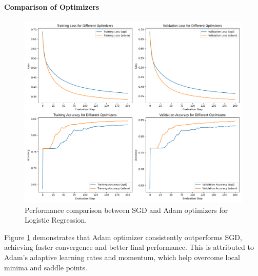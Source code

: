 \documentclass[journal, a4paper]{IEEEtran}
\begin{document}
\paragraph{Comparison of Optimizers}
\begin{figure}[htbp]
\centering
\includegraphics[width=\linewidth]{logistic_regression_optimizers.png}
\caption{Performance comparison between SGD and Adam optimizers for Logistic Regression.}
\label{fig:lr_opt}
\end{figure}

Figure \ref{fig:lr_opt} demonstrates that Adam optimizer consistently outperforms SGD, achieving faster convergence and better final performance. This is attributed to Adam's adaptive learning rates and momentum, which help overcome local minima and saddle points.
\end{document}
